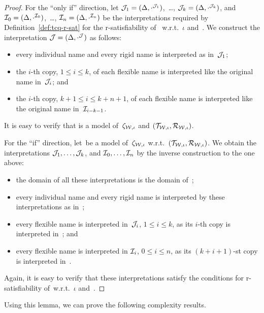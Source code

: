 \begin{proof}
    For the \enquote{only if} direction, let
    $\mathcal{J}_1=(\Delta,\cdot^{\mathcal{J}_1})$,~\dots, $\mathcal{J}_k=(\Delta,\cdot^{\mathcal{J}_k})$,
    and $\mathcal{I}_0=(\Delta,\cdot^{\mathcal{I}_0})$,~\dots,
    $\mathcal{I}_n=(\Delta,\cdot^{\mathcal{I}_n})$ be the interpretations required by
    Definition~\ref{def:tcq-r-sat} for the r-satisfiability of~\Wmc
    w.r.t.~$\iota$ and~\Kmc.  We construct the interpretation
    $\mathcal{J}=(\Delta,\cdot^\mathcal{J})$ as follows:
    \begin{itemize}
        \item every individual name and every rigid name is interpreted as
            in~$\mathcal{J}_1$;
        \item the $i$-th copy, $1\le i\le k$, of each flexible name is
            interpreted like the original name in~$\mathcal{J}_i$; and
        \item the $i$-th copy, $k+1\le i\le k+n+1$, of each flexible name is
            interpreted like the original name in~$\mathcal{I}_{i-k-1}$.
    \end{itemize}
    It is easy to verify that \Jmc is a model of~$\zeta_{\mathcal{W},\iota}$ and
    $(\mathcal{T}_{\mathcal{W},\iota},\mathcal{R}_{\mathcal{W},\iota})$.

    For the \enquote{if} direction, let~\Jmc be a model of~$\zeta_{\mathcal{W},\iota}$
    w.r.t.\ $(\mathcal{T}_{\mathcal{W},\iota},\mathcal{R}_{\mathcal{W},\iota})$.  We obtain the
    interpretations $\mathcal{J}_1,\dots,\mathcal{J}_k$, and $\mathcal{I}_0,\dots,\mathcal{I}_n$ by the
    inverse construction to the one above:
    \begin{itemize}
        \item the domain of all these interpretations is the domain of~\Jmc;
        \item every individual name and every rigid name is interpreted by these
            interpretations as in~\Jmc;
        \item every flexible name is interpreted in~$\mathcal{J}_i$, $1\le i\le k$, as
            its $i$-th copy is interpreted in~\Jmc; and
        \item every flexible name is interpreted in $\mathcal{I}_i$, $0\le i\le n$, as
            its $(k+i+1)$-st copy is interpreted in~\Jmc.
    \end{itemize}
    Again, it is easy to verify that these interpretations satisfy the
    conditions for r-satisfiability of~\Wmc w.r.t.~$\iota$ and~\Kmc.
\end{proof}

\noindent
Using this lemma, we can prove the following complexity results.


